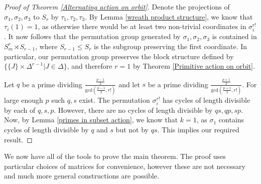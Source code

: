 \documentclass[letterpaper]{amsart}
\begin{document}
\begin{proof}[Proof of Theorem \ref{Alternating action on orbit}]
    Denote the projections of $\sigma_1,\sigma_2,\sigma_3$ to $S_r$ by $\tau_1,\tau_2,\tau_3$. By Lemma \ref{wreath product structure}, we know that $\tau_i(1) = 1$, as otherwise there would be at least two non-trivial coordinates in $\sigma_i^{r!}$. It now follows that the permutation group generated by $\sigma_1,\sigma_2,\sigma_3$ is contained in $S_m^r \rtimes S_{r-1}$, where $S_{r - 1} \leq S_r$ is the subgroup preserving the first coordinate. In particular, our permutation group preserves the block structure defined by $\{\{J\} \times \Delta^{r-1} | J \in \Delta\}$, and therefore $r = 1$ by Theorem \ref{Primitive action on orbit}.

Let $q$ be a prime dividing $\frac{\frac{p-1}{2}}{\mathrm{gcd}(\frac{p-1}{2},r!)}$ and let $s$ be a prime dividing $\frac{\frac{p+1}{2}}{\mathrm{gcd}(\frac{p+1}{2}, r!)}$. For large enough $p$ such $q,s$ exist. The permutation $\sigma_i^{r!}$ has cycles of length divisible by each of $q,s,p.$ However, there are no cycles of length divisible by $qs, qp, sp$. Now, by Lemma \ref{primes in subset action}, we know that $k = 1$, as $\sigma_1$ contains cycles of length divisible by $q$ and $s$ but not by $qs$. This implies our required result.
\end{proof}
We now have all of the tools to prove the main theorem. The proof uses particular choices of matrices for convenience, however these are not necessary and much more general constructions are possible.
\end{document}
